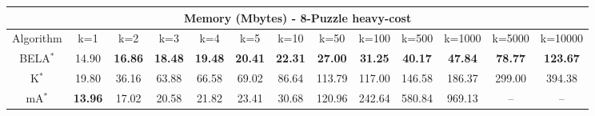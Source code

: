 \begin{tabular}{c|cccccccccccc}\toprule
\multicolumn{13}{c}{Memory (Mbytes) - 8-Puzzle heavy-cost}\\ \midrule
Algorithm & k=1 & k=2 & k=3 & k=4 & k=5 & k=10 & k=50 & k=100 & k=500 & k=1000 & k=5000 & k=10000 \\ \midrule
BELA$^*$ & 14.90 & \textbf{16.86} & \textbf{18.48} & \textbf{19.48} & \textbf{20.41} & \textbf{22.31} & \textbf{27.00} & \textbf{31.25} & \textbf{40.17} & \textbf{47.84} & \textbf{78.77} & \textbf{123.67} \\
K$^*$ & 19.80 & 36.16 & 63.88 & 66.58 & 69.02 & 86.64 & 113.79 & 117.00 & 146.58 & 186.37 & 299.00 & 394.38 \\
mA$^*$ & \textbf{13.96} & 17.02 & 20.58 & 21.82 & 23.41 & 30.68 & 120.96 & 242.64 & 580.84 & 969.13 & -- & -- \\ \bottomrule 
\end{tabular}

